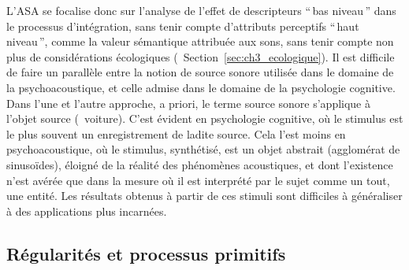 {L'ASA se focalise donc sur l'analyse de l'effet de descripteurs ``\,bas niveau\,'' dans le processus d'intégration, sans tenir compte d'attributs perceptifs ``\,haut niveau\,'', comme la valeur sémantique attribuée aux sons, sans tenir compte non plus de considérations écologiques (\cf~Section~\ref{sec:ch3_ecologique}). Il est difficile de faire un parallèle entre la notion de source sonore utilisée dans le domaine de la psychoacoustique, et celle admise dans le domaine de la psychologie cognitive. Dans l'une et l'autre approche, a priori, le terme source sonore s'applique à l'objet source (\eg~voiture). C'est évident en psychologie cognitive, où le stimulus est le plus souvent un enregistrement de ladite source. Cela l'est moins en psychoacoustique, où le stimulus, synthétisé, est un objet abstrait (agglomérat de sinusoïdes), éloigné de la réalité des phénomènes acoustiques, et dont l'existence n'est avérée que dans la mesure où il est interprété par le sujet comme un tout, une entité. Les résultats obtenus à partir de ces stimuli sont difficiles à généraliser à des applications plus incarnées.

\subsection{Régularités et processus primitifs}
\label{sec:ch3_regularitesEtProcessusPrimitifs}

}
